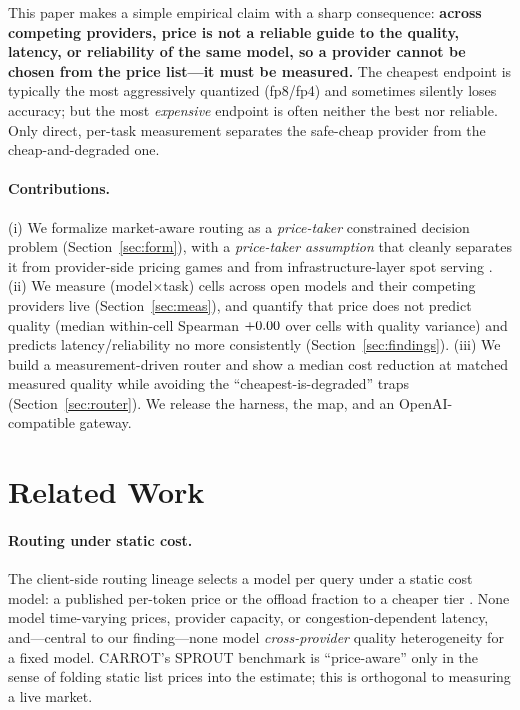 \documentclass{article}
\begin{document}
This paper makes a simple empirical claim with a sharp consequence: \textbf{across competing
providers, price is not a reliable guide to the quality, latency, or reliability of the same
model, so a provider cannot be chosen from the price list---it must be measured.} The
cheapest endpoint is typically the most aggressively quantized (fp8/fp4) and sometimes silently
loses accuracy; but the most \emph{expensive} endpoint is often neither the best nor reliable.
Only direct, per-task measurement separates the safe-cheap provider from the cheap-and-degraded
one.

\paragraph{Contributions.}
(i) We formalize market-aware routing as a \emph{price-taker} constrained decision problem
(Section~\ref{sec:form}), with a \emph{price-taker assumption} that cleanly separates it from
provider-side pricing games \citep{prillm2025} and from infrastructure-layer spot serving
\citep{miao2024spotserve,liu2025skyserve}. (ii) We measure \numcells{} (model$\times$task) cells
across \nummodels{} open models and their competing providers live (Section~\ref{sec:meas}),
and quantify that price does not predict quality (median within-cell Spearman $+0.00$ over
\corrqualn{} cells with quality variance) and predicts latency/reliability no more consistently
(Section~\ref{sec:findings}).
(iii) We build a measurement-driven router and show a median \medsave{} cost reduction at
matched measured quality while avoiding the \numtraps{} ``cheapest-is-degraded'' traps
(Section~\ref{sec:router}). We release the harness, the map, and an OpenAI-compatible gateway.

\section{Related Work}
\paragraph{Routing under static cost.} The client-side routing lineage selects a model per
query under a static cost model: a published per-token price or the offload fraction to a
cheaper tier \citep{chen2023frugalgpt,ong2024routellm,ding2024hybrid,somerstep2025carrot,
wang2025mixllm}. None model time-varying prices, provider capacity, or congestion-dependent
latency, and---central to our finding---none model \emph{cross-provider} quality heterogeneity
for a fixed model. CARROT's SPROUT benchmark is ``price-aware'' only in the sense of folding
static list prices into the estimate; this is orthogonal to measuring a live market.
\end{document}
